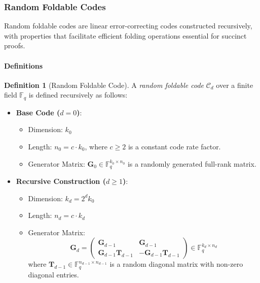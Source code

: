 \documentclass{article}
\theoremstyle{plain}
\theoremstyle{definition}
\newtheorem{definition}[theorem]{Definition}
\theoremstyle{remark}
\theoremstyle{problem}
\begin{document}
\subsubsection{Random Foldable Codes}

Random foldable codes are linear error-correcting codes constructed recursively, with properties that facilitate efficient folding operations essential for succinct proofs.

\paragraph{Definitions}

\begin{definition}[Random Foldable Code]
A \emph{random foldable code} $\mathcal{C}_d$ over a finite field $\mathbb{F}_{q}$ is defined recursively as follows:

\begin{itemize}
    \item \textbf{Base Code ($d = 0$)}:
    \begin{itemize}
        \item Dimension: $k_0$
        \item Length: $n_0 = c \cdot k_0$, where $c \geq 2$ is a constant code rate factor.
        \item Generator Matrix: $\mathbf{G}_0 \in \mathbb{F}_q^{k_0 \times n_0}$ is a randomly generated full-rank matrix.
    \end{itemize}

    \item \textbf{Recursive Construction ($d \geq 1$)}:
    \begin{itemize}
        \item Dimension: $k_d = 2^d k_0$
        \item Length: $n_d = c \cdot k_d$
        \item Generator Matrix:
        \[
        \mathbf{G}_d = \begin{pmatrix}
        \mathbf{G}_{d-1} & \mathbf{G}_{d-1} \\
        \mathbf{G}_{d-1} \mathbf{T}_{d-1} & -\mathbf{G}_{d-1} \mathbf{T}_{d-1}
        \end{pmatrix} \in \mathbb{F}_q^{k_d \times n_d}
        \]
        where $\mathbf{T}_{d-1} \in \mathbb{F}_q^{n_{d-1} \times n_{d-1}}$ is a random diagonal matrix with non-zero diagonal entries.
    \end{itemize}
\end{itemize}
\end{definition}
\end{document}

